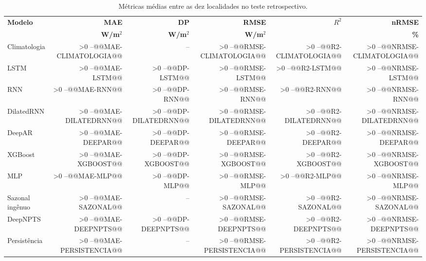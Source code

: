 \documentclass[12pt,a4paper,fleqn]{article}
\makeatletter
\newcommand{\resultado}[1]{%
  \ifnum\pdfmatch{^@@}{\detokenize{#1}}>0 --\else #1\fi}
\makeatother
\begin{document}
\begin{table}[!ht]
\centering
\caption{Métricas médias entre as dez localidades no teste retrospectivo.}
\label{tab:medias}
\setlength{\tabcolsep}{4.5pt}
\renewcommand{\arraystretch}{1.0}
\begin{tabular}{lrrrrr}
\toprule
\textbf{Modelo} & \textbf{MAE} & \textbf{DP} & \textbf{RMSE} & \textbf{$R^2$} & \textbf{nRMSE} \\
 & \textbf{W/m$^2$} & \textbf{W/m$^2$} & \textbf{W/m$^2$} & & \textbf{\%} \\
\midrule
Climatologia    & \resultado{@@MAE-CLIMATOLOGIA@@} & -- & \resultado{@@RMSE-CLIMATOLOGIA@@} & \resultado{@@R2-CLIMATOLOGIA@@} & \resultado{@@NRMSE-CLIMATOLOGIA@@} \\
LSTM            & \resultado{@@MAE-LSTM@@} & \resultado{@@DP-LSTM@@} & \resultado{@@RMSE-LSTM@@} & \resultado{@@R2-LSTM@@} & \resultado{@@NRMSE-LSTM@@} \\
RNN             & \resultado{@@MAE-RNN@@} & \resultado{@@DP-RNN@@} & \resultado{@@RMSE-RNN@@} & \resultado{@@R2-RNN@@} & \resultado{@@NRMSE-RNN@@} \\
DilatedRNN      & \resultado{@@MAE-DILATEDRNN@@} & \resultado{@@DP-DILATEDRNN@@} & \resultado{@@RMSE-DILATEDRNN@@} & \resultado{@@R2-DILATEDRNN@@} & \resultado{@@NRMSE-DILATEDRNN@@} \\
DeepAR          & \resultado{@@MAE-DEEPAR@@} & \resultado{@@DP-DEEPAR@@} & \resultado{@@RMSE-DEEPAR@@} & \resultado{@@R2-DEEPAR@@} & \resultado{@@NRMSE-DEEPAR@@} \\
XGBoost         & \resultado{@@MAE-XGBOOST@@} & \resultado{@@DP-XGBOOST@@} & \resultado{@@RMSE-XGBOOST@@} & \resultado{@@R2-XGBOOST@@} & \resultado{@@NRMSE-XGBOOST@@} \\
MLP             & \resultado{@@MAE-MLP@@} & \resultado{@@DP-MLP@@} & \resultado{@@RMSE-MLP@@} & \resultado{@@R2-MLP@@} & \resultado{@@NRMSE-MLP@@} \\
Sazonal ingênuo & \resultado{@@MAE-SAZONAL@@} & -- & \resultado{@@RMSE-SAZONAL@@} & \resultado{@@R2-SAZONAL@@} & \resultado{@@NRMSE-SAZONAL@@} \\
DeepNPTS        & \resultado{@@MAE-DEEPNPTS@@} & \resultado{@@DP-DEEPNPTS@@} & \resultado{@@RMSE-DEEPNPTS@@} & \resultado{@@R2-DEEPNPTS@@} & \resultado{@@NRMSE-DEEPNPTS@@} \\
Persistência    & \resultado{@@MAE-PERSISTENCIA@@} & -- & \resultado{@@RMSE-PERSISTENCIA@@} & \resultado{@@R2-PERSISTENCIA@@} & \resultado{@@NRMSE-PERSISTENCIA@@} \\
\bottomrule
\end{tabular}
\end{table}
\end{document}
